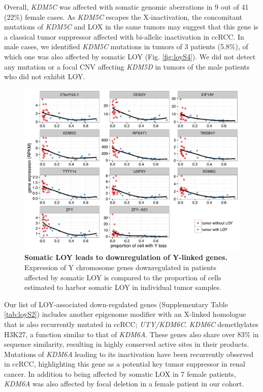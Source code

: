 Overall, {\it KDM5C} was affected with somatic genomic aberrations in 9 out of 41 (22\%) female cases.
As {\it KDM5C} escapes the X-inactivation\cite{Agulnik1994}, the concomitant mutations of {\it KDM5C} and LOX in the same tumors may suggest that this gene is a classical tumor suppressor affected with bi-allelic inactivation in ccRCC.
In male cases, we identified {\it KDM5C} mutations in tumors of 3 patients (5.8\%), of which one was also affected by somatic LOY (Fig. \ref{fig:loyS4}).
We did not detect any mutation or a focal CNV affecting {\it KDM5D} in tumors of the male patients who did not exhibit LOY.

\begin{figure}[ht]
  \centering
  \includegraphics[width=.8\linewidth]{figures/LOY-fig3.pdf}
  \caption[Somatic LOY leads to downregulation of Y-linked genes.]{{\bf Somatic LOY leads to downregulation of Y-linked genes.} {\small Expression of Y chromosome genes downregulated in patients affected by somatic LOY is compared to the proportion of cells estimated to harbor somatic LOY in individual tumor samples.}}
  \label{fig:loy3}
\end{figure}

Our list of LOY-associated down-regulated genes (Supplementary Table \ref{tab:loyS2}) includes another epigenome modifier with an X-linked homologue that is also recurrently mutated in ccRCC; {\it UTY/KDM6C}.
{\it KDM6C} demethylates H3K27, a function similar to that of {\it KDM6A}\cite{Walport2014}.
These genes also share over 83\% in sequence similarity, resulting in highly conserved active sites in their products.
Mutations of {\it KDM6A} leading to its inactivation have been recurrently observed in ccRCC\cite{Dalgliesh2010,VanHaaften2009}, highlighting this gene as a potential key tumor suppressor in renal cancer.
In addition to being affected by somatic LOX in 7 female patients, {\it KDM6A} was also affected by focal deletion in a female patient in our cohort.

